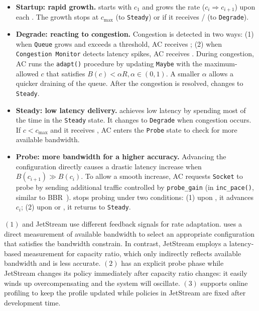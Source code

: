 \begin{itemize}[leftmargin=*, topsep=3pt, itemsep=0pt]

\item \textbf{Startup: rapid growth.} \sysname{} starts with $c_1$ and grows the
  rate ($c_i \Rightarrow c_{i+1}$) upon each \qe{}. The growth stops at
  $c_{\max}$ (to \texttt{Steady}) or if it receives \qc{}/\rc{} (to
  \texttt{Degrade}).

\item \textbf{Degrade: reacting to congestion.} Congestion is detected in two
  ways: (1) when \texttt{Queue} grows and exceeds a threshold, AC receives
  \qc{}; (2) when \texttt{Congestion Monitor} detects latency spikes, AC
  receives \rc{}. During congestion, AC runs the \texttt{adapt()} procedure by
  updating \texttt{Maybe} with the maximum-allowed $c$ that satisfies
  $B(c) < \alpha R, \alpha \in (0, 1)$. A smaller $\alpha$ allows a quicker
  draining of the queue. After the congestion is resolved, \sysname{} changes to
  \texttt{Steady}.

\item \textbf{Steady: low latency delivery.} \sysname{} achieves low latency by
  spending most of the time in the \texttt{Steady} state. It changes to
  \texttt{Degrade} when congestion occurs. If $c < c_{\max}$ and it receives
  \qe{}, AC enters the \texttt{Probe} state to check for more available
  bandwidth.

\item \textbf{Probe: more bandwidth for a higher accuracy.} Advancing the
  configuration directly causes a drastic latency increase when
  $B(c_{i+1}) \gg B(c_i)$. To allow a smooth increase, AC requests
  \texttt{Socket} to probe by sending additional traffic controlled by
  \texttt{probe\_gain} (in \texttt{inc\_pace()}, similar to
  BBR~\cite{cardwell2017bbr}). \sysname{} stops probing under two conditions:
  (1) upon \spd{}, it advances $c_i$; (2) upon \qc{} or \rc{}, it returns to
  \texttt{Steady}.

\end{itemize}

 $(1)$ \sysname{} and JetStream use different
feedback signals for rate adaptation. \sysname{} uses a direct measurement of
available bandwidth to select an appropriate configuration that satisfies the
bandwidth constrain. In contrast, JetStream employs a latency-based measurement
for capacity ratio, which only indirectly reflects available bandwidth and is
less accurate. $(2)$ \sysname{} has an explicit probe phase while JetStream
changes its policy immediately after capacity ratio changes: it easily winds up
overcompensating and the system will oscillate. $(3)$ \sysname{} supports online
profiling to keep the profile updated while policies in JetStream are fixed
after development time.

